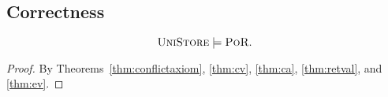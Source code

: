 
\subsection{\unistore{} Correctness} \label{ss:unistore-correctness}

\begin{apptheorem} \label{thm:unistore-por}
  \[
    \textsc{UniStore} \models \textsc{PoR}.
  \]
\end{apptheorem}

\begin{proof} \label{proof:unistore-por}
  By Theorems~\ref{thm:conflictaxiom}, \ref{thm:cv},
  \ref{thm:ca}, \ref{thm:retval}, and \ref{thm:ev}.
\end{proof}
